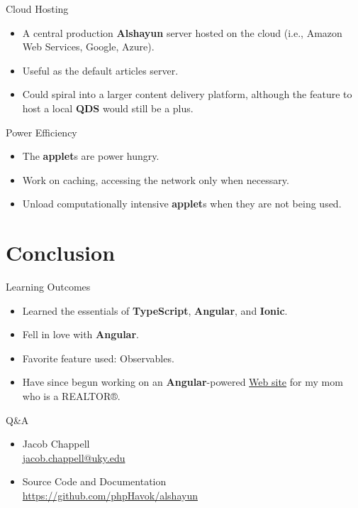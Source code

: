 \documentclass{beamer}
\begin{document}
\begin{frame}{Cloud Hosting}
    \begin{itemize}
        \item A central production \textbf{Alshayun} server hosted on the cloud
            (i.e., Amazon Web Services, Google, Azure).
        \item Useful as the default articles server.
        \item Could spiral into a larger content delivery platform, although the
            feature to host a local \textbf{QDS} would still be a plus.
    \end{itemize}
\end{frame}

\begin{frame}{Power Efficiency}
    \begin{itemize}
        \item The \textbf{applet}s are power hungry.
        \item Work on caching, accessing the network only when necessary.
        \item Unload computationally intensive \textbf{applet}s when they are
            not being used.
    \end{itemize}
\end{frame}

\section{Conclusion}

\begin{frame}{Learning Outcomes}
    \begin{itemize}
        \item Learned the essentials of \textbf{TypeScript}, \textbf{Angular},
            and \textbf{Ionic}.
        \item Fell in love with \textbf{Angular}.
        \item Favorite feature used: Observables.
        \item Have since begun working on an \textbf{Angular}-powered
            \href{https://kristinickells.com}{Web site} for my mom who is a
            REALTOR®.
    \end{itemize}
\end{frame}

\begin{frame}{Q\&A}
    \begin{itemize}
        \item \begin{center}
                Jacob Chappell \\
                \href{mailto:jacob.chappell@uky.edu}{jacob.chappell@uky.edu}
                \vfill
        \end{center}
        \item \begin{center}
                Source Code and Documentation \\ \url{https://github.com/phpHavok/alshayun}
        \end{center}
    \end{itemize}
\end{frame}
\end{document}
